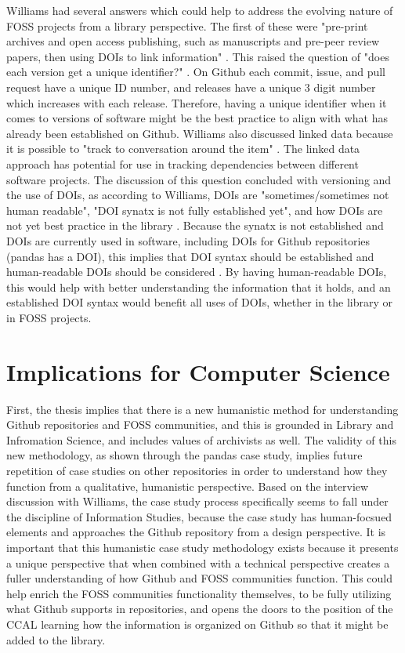 Williams had several answers which could help to address the evolving nature of FOSS projects from a library perspective. The first of these were "pre-print archives and open access publishing, such as manuscripts and pre-peer review papers, then using DOIs to link information" \cite{patrickinterview}. This raised the question of "does each version get a unique identifier?" \cite{patrickinterview}. On Github each commit, issue, and pull request have a unique ID number, and releases have a unique 3 digit number which increases with each release. Therefore, having a unique identifier when it comes to versions of software might be the best practice to align with what has already been established on Github. Williams also discussed linked data because it is possible to "track to conversation around the item" \cite{patrickinterview}. The linked data approach has potential for use in tracking dependencies between different software projects. The discussion of this question concluded with versioning and the use of DOIs, as according to Williams, DOIs are "sometimes/sometimes not human readable", "DOI synatx is not fully established yet", and how DOIs are not yet best practice in the library \cite{patrickinterview}. Because the synatx is not established and DOIs are currently used in software, including DOIs for Github repositories (pandas has a DOI), this implies that DOI syntax should be established and human-readable DOIs should be considered \cite{pandasrepo}. By having human-readable DOIs, this would help with better understanding the information that it holds, and an established DOI syntax would benefit all uses of DOIs, whether in the library or in FOSS projects.

\section{Implications for Computer Science}

First, the thesis implies that there is a new humanistic method for understanding Github repositories and FOSS communities, and this is grounded in Library and Infromation Science, and includes values of archivists as well. The validity of this new methodology, as shown through the pandas case study, implies future repetition of case studies on other repositories in order to understand how they function from a qualitative, humanistic perspective. Based on the interview discussion with Williams, the case study process specifically seems to fall under the discipline of Information Studies, because the case study has human-focsued elements and approaches the Github repository from a design perspective\cite{patrickinterview}. It is important that this humanistic case study methodology exists because it presents a unique perspective that when combined with a technical perspective creates a fuller understanding of how Github and FOSS communities function. This could help enrich the FOSS communities functionality themselves, to be fully utilizing what Github supports in repositories, and opens the doors to the position of the CCAL learning how the information is organized on Github so that it might be added to the library. 

